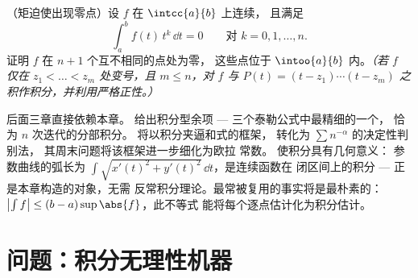 \begin{exercise}[$\star\star\star$]\label{exo:b1:integration:12}
（矩迫使出现零点）设 $f$ 在 $\intcc{a}{b}$ 上连续，
且满足
\[
\int_a^b f(t)\,t^k\,\dd t = 0 \qquad \text{对 } k = 0, 1,
\dots, n .
\]
证明 $f$ 在 $n + 1$ 个互不相同的点处为零，
这些点位于 $\intoo{a}{b}$ 内。\emph{（若 $f$ 仅在 $z_1 < \dots
< z_m$ 处变号，且 $m \leq n$，对 $f$ 与 $P(t) = (t - z_1)
\cdots (t - z_m)$ 之积作积分，并利用严格正性。）}
\end{exercise}

\begin{remark}[本分册内的展望]
后面三章直接依赖本章。
 给出积分型余项 --- 三个泰勒公式中最精细的一个，
恰为 $n$ 次迭代的分部积分。
 将以积分夹逼和式的框架，
转化为 $\sum n^{-\alpha}$ 的决定性判别法，
其周末问题将该框架进一步细化为欧拉
常数。 使积分具有几何意义：
参数曲线的弧长为 $\int \sqrt{x'(t)^2 +
y'(t)^2}\,\dd t$，是连续函数在
闭区间上的积分 --- 正是本章构造的对象，无需
反常积分理论。最常被复用的事实将是最朴素的：
$\bigl|\int f\bigr| \leq (b - a)\sup\abs{f}$，此不等式
能将每个逐点估计化为积分估计。
\end{remark}

\section{问题：积分无理性机器}

